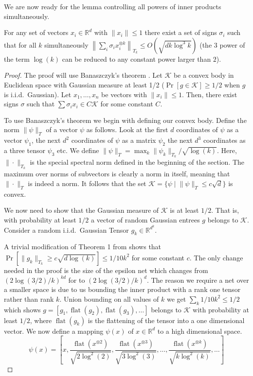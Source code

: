 \documentclass[anon,12pt]{colt2019} %
\newcommand{\R}{\mathbb{R}}
\renewcommand{\Pr}{\operatorname{Pr}}
\begin{document}
{We are now ready for the lemma controlling all powers of inner products simultaneously. 

\begin{lemma}\label{uc}
For any set of vectors $x_i \in \R^d$ with $\|x_i\| \leq 1$ there exist a set of signs $\sigma_i$ such that for all $k$ simultaneously $\left\| \sum_i \sigma_i x_i^{\otimes k} \right\|_{T_k} \le O(\sqrt{d k\log^{3}{k}})$ (the $3$ power of the term $\log(k)$ can be reduced to any constant power larger than $2$). 
\end{lemma}
\begin{proof}
The proof will use Banaszczyk's theorem \cite{Banaszczyk}. 
Let $\mathcal K$ be a convex body in Euclidean space with Gaussian measure at least 1/2 ($\Pr[g \in \mathcal K] \ge 1/2$ when $g$ is i.i.d.\ Gaussian).
Let $x_1,\ldots,x_n$ be vectors with $\|x_i\| \leq 1$. 
Then, there exist signs $\sigma$ such that $\sum \sigma_i x_i \in C \mathcal K$ for some constant $C$.

To use Banaszczyk's theorem we begin with defining our convex body.
Define the norm $\|\psi\|_T$ of a vector $\psi$ as follows. Look at the first $d$ coordinates of $\psi$ as a vector $\psi_1$, the next $d^2$ coordinates of $\psi$ as a matrix $\psi_2$ the next $d^3$ coordinates as a three tensor $\psi_3$ etc.
We define $\|\psi\|_T = \max_k \|\psi_k\|_{T_k} /\sqrt{\log(k)}$. 
Here, $\|\cdot\|_{T_k}$ is the special spectral norm defined in the beginning of the section.
The maximum over norms of subvectors is clearly a norm in itself, meaning that $\|\cdot \|_T$ is indeed a norm. It follows that  the set $\mathcal K  = \{\psi \; | \; \|\psi\|_T \le c\sqrt{d}\}$ is convex. 

We now need to show that the Gaussian measure of $\mathcal K$ is at least $1/2$. 
That is, with probability at least $1/2$ a vector of random Gaussian entrees $g$ belongs to $\mathcal K$.
Consider a random i.i.d.\ Gaussian Tensor $g_k \in \R^{d^k}$. 

A trivial modification of Theorem 1 from \cite{tomioka2014spectral} shows that $\Pr[\|g_k\|_{T_k} \ge c\sqrt{d\log(k)}] \le 1/10k^2$ for some constant $c$. The only change needed in the proof is the size of the epsilon net which changes from $(2\log(3/2)/k)^{kd}$ for \cite{tomioka2014spectral} to $(2\log(3/2)/k)^d$. The reason we require a net over a smaller space is due to us bounding the inner product with a rank one tensor rather than rank $k$. Union bounding on all values of $k$ we get $\sum_k 1/10k^2 \le 1/2$ which shows $g = [g_1, \operatorname{flat}(g_2), \operatorname{flat}(g_3), \ldots]$ belongs to $\mathcal K$ with probability at least $1/2$, where $\operatorname{flat}(g_k)$ is the flattening of the tensor into a one dimensional vector. 
%
We now define a mapping $\psi(x)$ of $x\in \R^d$ to a high dimensional space. 
$$\psi(x) = \left[x, \frac{\operatorname{flat}(x^{\otimes 2})}{\sqrt{2\log^2(2)}}, \frac{\operatorname{flat}(x^{\otimes 3})}{\sqrt{3\log^2(3)}}, \ldots,\frac{\operatorname{flat}(x^{\otimes k})}{\sqrt{k\log^2(k)}},\ldots \right]$$


\end{proof}}
\end{document}

